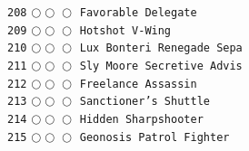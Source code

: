 \documentclass[a4paper,landscape]{article}
\begin{document}
\begin{multicols*}{5}
\texttt{208} \(\bigcirc\!\bigcirc\!\bigcirc\)  \texttt{Favorable Delegate} \vspace{-0.3mm}\\ 
\texttt{209} \(\bigcirc\!\bigcirc\!\bigcirc\)  \texttt{Hotshot V-Wing} \vspace{-0.3mm}\\ 
\texttt{210} \(\bigcirc\!\bigcirc\!\bigcirc\)  \texttt{Lux Bonteri Renegade Sepa} \vspace{-0.3mm}\\ 
\texttt{211} \(\bigcirc\!\bigcirc\!\bigcirc\)  \texttt{Sly Moore Secretive Advis} \vspace{-0.3mm}\\ 
\texttt{212} \(\bigcirc\!\bigcirc\!\bigcirc\)  \texttt{Freelance Assassin} \vspace{-0.3mm}\\ 
\texttt{213} \(\bigcirc\!\bigcirc\!\bigcirc\)  \texttt{Sanctioner's Shuttle} \vspace{-0.3mm}\\ 
\texttt{214} \(\bigcirc\!\bigcirc\!\bigcirc\)  \texttt{Hidden Sharpshooter} \vspace{-0.3mm}\\ 
\texttt{215} \(\bigcirc\!\bigcirc\!\bigcirc\)  \texttt{Geonosis Patrol Fighter} \vspace{-0.3mm}\\ 

\end{multicols*}
\end{document}
